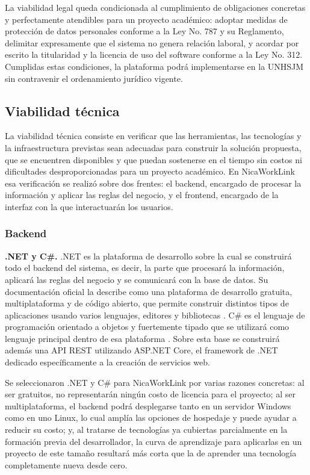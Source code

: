 La viabilidad legal queda condicionada al cumplimiento de obligaciones concretas y perfectamente atendibles para un proyecto académico: adoptar medidas de protección de datos personales conforme a la Ley No. 787 y su Reglamento, delimitar expresamente que el sistema no genera relación laboral, y acordar por escrito la titularidad y la licencia de uso del software conforme a la Ley No. 312. Cumplidas estas condiciones, la plataforma podrá implementarse en la UNHSJM sin contravenir el ordenamiento jurídico vigente.

\newpage

\subsection{Viabilidad técnica}

La viabilidad técnica consiste en verificar que las herramientas, las tecnologías y la infraestructura previstas sean adecuadas para construir la solución propuesta, que se encuentren disponibles y que puedan sostenerse en el tiempo sin costos ni dificultades desproporcionadas para un proyecto académico. En NicaWorkLink esa verificación se realizó sobre dos frentes: el backend, encargado de procesar la información y aplicar las reglas del negocio, y el frontend, encargado de la interfaz con la que interactuarán los usuarios.

\subsubsection{Backend}

\textbf{.NET y C\#.} .NET es la plataforma de desarrollo sobre la cual se construirá todo el backend del sistema, es decir, la parte que procesará la información, aplicará las reglas del negocio y se comunicará con la base de datos. Su documentación oficial la describe como una plataforma de desarrollo gratuita, multiplataforma y de código abierto, que permite construir distintos tipos de aplicaciones usando varios lenguajes, editores y bibliotecas \parencite{microsoft_net}. C\# es el lenguaje de programación orientado a objetos y fuertemente tipado que se utilizará como lenguaje principal dentro de esa plataforma \parencite{microsoft_csharp}. Sobre esta base se construirá además una API REST utilizando ASP.NET Core, el framework de .NET dedicado específicamente a la creación de servicios web.

Se seleccionaron .NET y C\# para NicaWorkLink por varias razones concretas: al ser gratuitos, no representarán ningún costo de licencia para el proyecto; al ser multiplataforma, el backend podrá desplegarse tanto en un servidor Windows como en uno Linux, lo cual amplía las opciones de hospedaje y puede ayudar a reducir su costo; y, al tratarse de tecnologías ya cubiertas parcialmente en la formación previa del desarrollador, la curva de aprendizaje para aplicarlas en un proyecto de este tamaño resultará más corta que la de aprender una tecnología completamente nueva desde cero.

